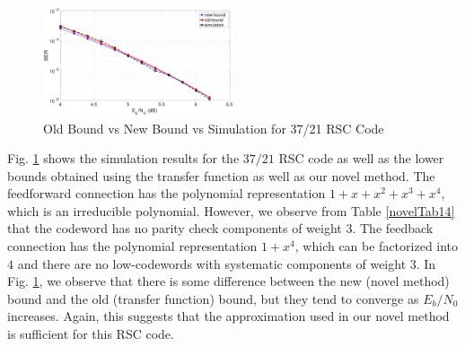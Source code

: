 \begin{figure}[htbp]
\centering
		\includegraphics[width=0.5\textwidth]{./Images/RSC_37_21_lower_weights.eps}
		\caption{Old Bound vs New Bound vs Simulation for 37/21 RSC Code}
		\label{simFig2}
		\end{figure}
Fig. \ref{simFig2} shows the simulation results for the $37/21$ RSC code as well as the lower bounds obtained using the transfer function as well as our novel method. The feedforward connection has the polynomial representation $1+x+x^2+x^3+x^4$, which is an irreducible polynomial. However, we observe from Table \ref{novelTab14} that the codeword has no parity check components of weight $3$. The feedback connection has the polynomial representation $1+x^4$, which can be factorized into $4$ and there are no low-codewords with systematic components of weight $3$. In Fig. \ref{simFig2}, we observe that there is some difference between the new (novel method) bound and the old (transfer function) bound, but they tend to converge as $E_b/N_0$ increases. Again, this suggests that the approximation used in our novel method is sufficient for this RSC code.

